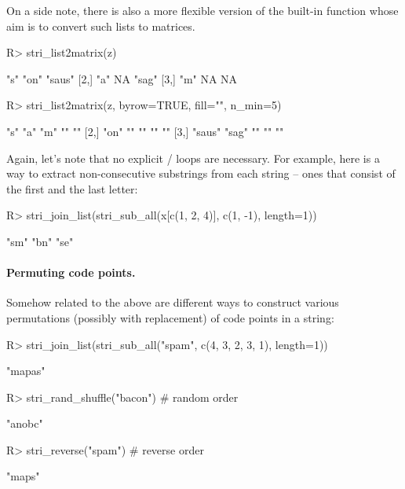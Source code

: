 \documentclass[nojss]{jss}
\begin{document}
On a side note, there is also a more flexible version
of the built-in  function whose
aim is to convert such lists to matrices.

\begin{Schunk}
\begin{Sinput}
R> stri_list2matrix(z)
\end{Sinput}
\begin{Soutput}
     [,1] [,2] [,3]
[1,] "s"  "on" "saus"
[2,] "a"  NA   "sag"
[3,] "m"  NA   NA
\end{Soutput}
\begin{Sinput}
R> stri_list2matrix(z, byrow=TRUE, fill="", n_min=5)
\end{Sinput}
\begin{Soutput}
     [,1]   [,2]  [,3] [,4] [,5]
[1,] "s"    "a"   "m"  ""   ""
[2,] "on"   ""    ""   ""   ""
[3,] "saus" "sag" ""   ""   ""
\end{Soutput}
\end{Schunk}


Again, let's note that no explicit / loops are necessary.
For example, here is a way to extract non-consecutive substrings from each string --
ones that consist of the first and the last letter:

\begin{Schunk}
\begin{Sinput}
R> stri_join_list(stri_sub_all(x[c(1, 2, 4)], c(1, -1), length=1))
\end{Sinput}
\begin{Soutput}
[1] "sm" "bn" "se"
\end{Soutput}
\end{Schunk}


\paragraph{Permuting code points.}
Somehow related to the above are different ways to construct
various permutations (possibly with replacement) of code points in a string:

\begin{Schunk}
\begin{Sinput}
R> stri_join_list(stri_sub_all("spam", c(4, 3, 2, 3, 1), length=1))
\end{Sinput}
\begin{Soutput}
[1] "mapas"
\end{Soutput}
\begin{Sinput}
R> stri_rand_shuffle("bacon")  # random order
\end{Sinput}
\begin{Soutput}
[1] "anobc"
\end{Soutput}
\begin{Sinput}
R> stri_reverse("spam")        # reverse order
\end{Sinput}
\begin{Soutput}
[1] "maps"
\end{Soutput}
\end{Schunk}
\end{document}
